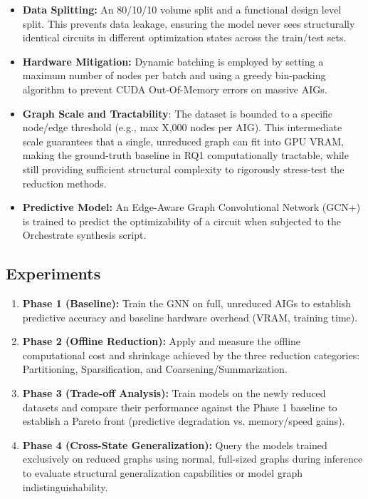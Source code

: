 \documentclass[paper=a4, fontsize=11pt]{scrartcl} %
\numberwithin{equation}{section} %
\numberwithin{figure}{section} %
\numberwithin{table}{section} %
\begin{document}
\begin{itemize}
    \item \textbf{Data Splitting:} An 80/10/10 volume split and a functional design level split. This prevents data leakage, ensuring the model never sees structurally identical circuits in different optimization states across the train/test sets.
    \item \textbf{Hardware Mitigation:} Dynamic batching is employed by setting a maximum number of nodes per batch and using a greedy bin-packing algorithm to prevent CUDA Out-Of-Memory errors on massive AIGs.
    \item \textbf{Graph Scale and Tractability}: The dataset is bounded to a specific node/edge threshold (e.g., max X,000 nodes per AIG). This intermediate scale guarantees that a single, unreduced graph can fit into GPU VRAM, making the ground-truth baseline in RQ1 computationally tractable, while still providing sufficient structural complexity to rigorously stress-test the reduction methods.
    \item \textbf{Predictive Model:} An Edge-Aware Graph Convolutional Network (GCN+) is trained to predict the optimizability of a circuit when subjected to the Orchestrate synthesis script.
\end{itemize}


\subsection{Experiments}
\begin{enumerate}
    \item \textbf{Phase 1 (Baseline):} Train the GNN on full, unreduced AIGs to establish predictive accuracy and baseline hardware overhead (VRAM, training time).
    \item \textbf{Phase 2 (Offline Reduction):} Apply and measure the offline computational cost and shrinkage achieved by the three reduction categories: Partitioning, Sparsification, and Coarsening/Summarization.
    \item \textbf{Phase 3 (Trade-off Analysis):} Train models on the newly reduced datasets and compare their performance against the Phase 1 baseline to establish a Pareto front (predictive degradation vs. memory/speed gains).
    \item \textbf{Phase 4 (Cross-State Generalization):} Query the models trained exclusively on reduced graphs using normal, full-sized graphs during inference to evaluate structural generalization capabilities or model graph indistinguishability.
\end{enumerate}
\end{document}
